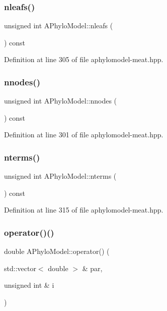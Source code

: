 \subsubsection{\texorpdfstring{nleafs()}{nleafs()}}
{\footnotesize\ttfamily unsigned int A\+Phylo\+Model\+::nleafs (\begin{DoxyParamCaption}{ }\end{DoxyParamCaption}) const}



Definition at line 305 of file aphylomodel-\/meat.\+hpp.

\mbox{\label{class_a_phylo_model_a5a13086298e421d18ed60e6ecfced009}} 
\subsubsection{\texorpdfstring{nnodes()}{nnodes()}}
{\footnotesize\ttfamily unsigned int A\+Phylo\+Model\+::nnodes (\begin{DoxyParamCaption}{ }\end{DoxyParamCaption}) const}



Definition at line 301 of file aphylomodel-\/meat.\+hpp.

\mbox{\label{class_a_phylo_model_ada9ba3e2df8586216573fa27566d92cb}} 
\subsubsection{\texorpdfstring{nterms()}{nterms()}}
{\footnotesize\ttfamily unsigned int A\+Phylo\+Model\+::nterms (\begin{DoxyParamCaption}{ }\end{DoxyParamCaption}) const}



Definition at line 315 of file aphylomodel-\/meat.\+hpp.

\mbox{\label{class_a_phylo_model_a9b3390c29ea7a3283e68e9a059b94138}} 
\subsubsection{\texorpdfstring{operator()()}{operator()()}}
{\footnotesize\ttfamily double A\+Phylo\+Model\+::operator() (\begin{DoxyParamCaption}\item[{std\+::vector$<$ double $>$ \&}]{par,  }\item[{unsigned int \&}]{i }\end{DoxyParamCaption})}

